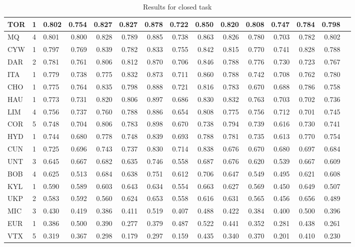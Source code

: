\documentclass[11pt,letterpaper]{article}
\begin{document}
\begin{table*}
\begin{footnotesize}
\begin{tabular}{|p{1cm}|c|p{1cm}|r|r|r|r|r|r|r|r|r|r|r|r|}
 TOR  & 1  & 0.802 & 0.754 & 0.827 & 0.827 & 0.878 & 0.722 & 0.850 & 0.820 & 0.808 & 0.747 & 0.784 & 0.798\\\hline
  MQ & 4  & 0.801 & 0.800 & 0.828 & 0.789 & 0.885 & 0.738 & 0.863 & 0.826 & 0.780 & 0.703 & 0.782 & 0.802\\\hline
 CYW  & 1  & 0.797 & 0.769 & 0.839 & 0.782 & 0.833 & 0.755 & 0.842 & 0.815 & 0.770 & 0.741 & 0.828 & 0.788\\\hline
DAR   & 2  & 0.781 & 0.761 & 0.806 & 0.812 & 0.870 & 0.706 & 0.846 & 0.788 & 0.776 & 0.730 & 0.723 & 0.767\\\hline
 ITA  & 1  & 0.779 & 0.738 & 0.775 & 0.832 & 0.873 & 0.711 & 0.860 & 0.788 & 0.742 & 0.708 & 0.762 & 0.780\\\hline
CHO  & 1  & 0.775 & 0.764 & 0.835 & 0.798 & 0.888 & 0.721 & 0.816 & 0.783 & 0.670 & 0.688 & 0.786 & 0.758\\\hline
HAU  & 1  & 0.773 & 0.731 & 0.820 & 0.806 & 0.897 & 0.686 & 0.830 & 0.832 & 0.763 & 0.703 & 0.702 & 0.736\\\hline
LIM   & 4  & 0.756 & 0.737 & 0.760 & 0.788 & 0.886 & 0.654 & 0.808 & 0.775 & 0.756 & 0.712 & 0.701 & 0.745\\\hline
 COR  & 5  & 0.748 & 0.704 & 0.806 & 0.783 & 0.898 & 0.670 & 0.738 & 0.794 & 0.739 & 0.616 & 0.730 & 0.741\\\hline
 HYD  & 1  & 0.744 & 0.680 & 0.778 & 0.748 & 0.839 & 0.693 & 0.788 & 0.781 & 0.735 & 0.613 & 0.770 & 0.754\\\hline
 CUN  & 1  & 0.725 & 0.696 & 0.743 & 0.737 & 0.830 & 0.714 & 0.838 & 0.676 & 0.670 & 0.680 & 0.697 & 0.684\\\hline
  UNT & 3  & 0.645 & 0.667 & 0.682 & 0.635 & 0.746 & 0.558 & 0.687 & 0.676 & 0.620 & 0.539 & 0.667 & 0.609\\\hline
BOB   & 4  & 0.625 & 0.513 & 0.684 & 0.638 & 0.751 & 0.612 & 0.706 & 0.647 & 0.549 & 0.495 & 0.621 & 0.608\\\hline
KYL  & 1  & 0.590 & 0.589 & 0.603 & 0.643 & 0.634 & 0.554 & 0.663 & 0.627 & 0.569 & 0.450 & 0.649 & 0.507\\\hline
 UKP  & 2  & 0.583 & 0.592 & 0.560 & 0.624 & 0.653 & 0.558 & 0.616 & 0.631 & 0.565 & 0.456 & 0.656 & 0.489\\\hline
 MIC  & 3  & 0.430 & 0.419 & 0.386 & 0.411 & 0.519 & 0.407 & 0.488 & 0.422 & 0.384 & 0.400 & 0.500 & 0.396\\\hline
EUR   & 1  & 0.386 & 0.500 & 0.390 & 0.277 & 0.379 & 0.487 & 0.522 & 0.441 & 0.352 & 0.281 & 0.438 & 0.261\\\hline
 VTX & 5  & 0.319 & 0.367 & 0.298 & 0.179 & 0.297 & 0.159 & 0.435 & 0.340 & 0.370 & 0.201 & 0.410 & 0.230\\\hline
\end{tabular}
\caption{Results for closed task\label{tab:results:closed}}
\end{footnotesize}
\end{table*}
\end{document}
